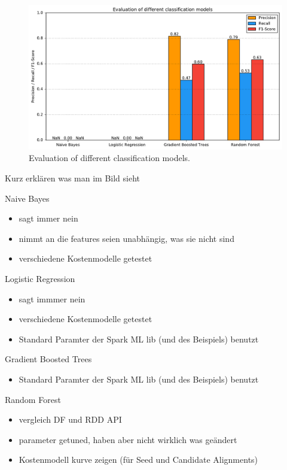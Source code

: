 \begin{figure}[H]
	\centering
	\includegraphics[width=\textwidth]{img/classifier_eval}
	\caption{Evaluation of different classification models.}
	\label{classifier_eval}
\end{figure}
Kurz erklären was man im Bild sieht\par
Naive Bayes
\begin{itemize}
	\item sagt immer nein
	\item nimmt an die features seien unabhängig, was sie nicht sind
	\item verschiedene Kostenmodelle getestet
\end{itemize}
Logistic Regression
\begin{itemize}
	\item sagt immmer nein
	\item verschiedene Kostenmodelle getestet
	\item Standard Paramter der Spark ML lib (und des Beispiels) benutzt
\end{itemize}
Gradient Boosted Trees
\begin{itemize}
	\item Standard Paramter der Spark ML lib (und des Beispiels) benutzt
\end{itemize}
Random Forest
\begin{itemize}
	\item vergleich DF und RDD API
	\item parameter getuned, haben aber nicht wirklich was geändert
	\item Kostenmodell kurve zeigen (für Seed und Candidate Alignments)
\end{itemize}
